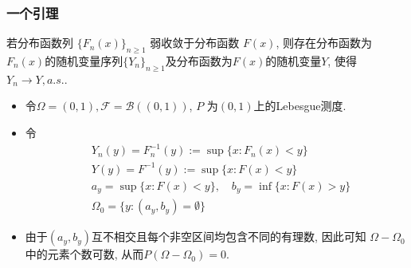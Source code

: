 \begin{frame}
	\frametitle{一个引理}
	\begin{thm}
		若分布函数列 $\{F_n(x)\}_{n\geq 1}$ 弱收敛于分布函数 $F (x)$, 则存在分布函数为$F_n(x)$的随机变量序列$\{Y_n\}_{n\geq 1}$及分布函数为$F(x)$的随机变量$Y$, 使得$Y_n\rightarrow Y, a.s.$.
	\end{thm}\pause

	\zheng %
		\begin{itemize}[<+-|alert@+>]
		\item 令$\Omega=(0,1), \mathcal{F}=\mathcal{B}((0,1))$, $P$ 为$(0,1)$上的Lebesgue测度.
		\item 令
		\begin{align*}
			&Y_{n}(y)=F_n^{-1}(y):=\sup \{x: F_{n}(x)<y\}\\
			&Y(y)=F^{-1}(y):=\sup \{x: F(x)<y\}\\
			&a_{y}=\sup \{x: F(x)<y\}, \quad b_{y}=\inf \{x: F(x)>y\}\\
			&\Omega_0=\{y:\left(a_{y}, b_{y}\right)=\emptyset\}
		\end{align*}
		 \item  由于$\left(a_{y}, b_{y}\right)$互不相交且每个非空区间均包含不同的有理数, 因此可知 $\Omega-\Omega_0$ 中的元素个数可数, 从而$P(\Omega-\Omega_0)=0$.

		\end{itemize}


\end{frame}


